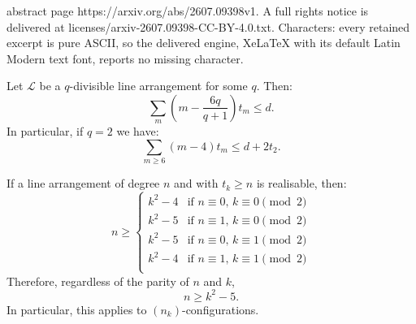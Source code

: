 \documentclass[10pt,a4paper]{amsart}
\newcommand{\cP}{\mathcal{P}}
\renewcommand{\L}{\mathcal{L}}
\begin{document}
abstract page https://arxiv.org/abs/2607.09398v1. A full rights notice is delivered at licenses/arxiv-2607.09398-CC-BY-4.0.txt. Characters: every retained excerpt is pure ASCII, so the delivered engine, XeLaTeX with its default Latin Modern text font, reports no missing character.
\begin{thm}\label{t:divisible}
Let $\L$ be a $q$-divisible line arrangement for some $q$. Then:
\[
\sum_m (m-{\textstyle \frac{6q}{q+1}})t_m \le d.
\]
In particular, if $q=2$ we have:
\[
\sum_{m \ge 6} (m-4)t_m \le d + 2t_2.
\]
\end{thm}

\begin{thm}\label{t:configurations}
If a line arrangement of degree $n$ and with $t_k \ge n$ is realisable, then:
\[
n \ge \left\{\begin{array}{ll}
k^2 - 4 & \mbox{if } n \equiv 0,\, k \equiv 0 \pmod 2\\
k^2 - 5 & \mbox{if } n \equiv 1,\, k \equiv 0 \pmod 2\\
k^2 - 5 & \mbox{if } n \equiv 0,\, k \equiv 1 \pmod 2\\
k^2 - 4 & \mbox{if } n \equiv 1,\, k \equiv 1 \pmod 2\\
\end{array}
\right.
\]
Therefore, regardless of the parity of $n$ and $k$,
\[
n \ge k^2-5.
\]
In particular, this applies to $(n_k)$-configurations.
\end{thm}
\end{document}
